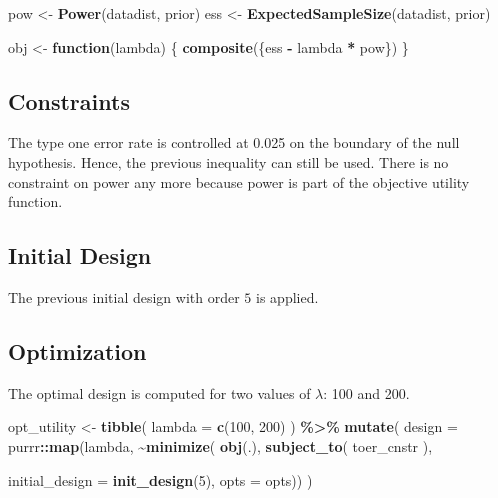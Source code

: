 \documentclass[
]{book}
\newenvironment{Shaded}{\begin{snugshade}}{\end{snugshade}}
\newcommand{\ControlFlowTok}[1]{\textcolor[rgb]{0.13,0.29,0.53}{\textbf{#1}}}
\newcommand{\DataTypeTok}[1]{\textcolor[rgb]{0.13,0.29,0.53}{#1}}
\newcommand{\DecValTok}[1]{\textcolor[rgb]{0.00,0.00,0.81}{#1}}
\newcommand{\KeywordTok}[1]{\textcolor[rgb]{0.13,0.29,0.53}{\textbf{#1}}}
\newcommand{\NormalTok}[1]{#1}
\newcommand{\OperatorTok}[1]{\textcolor[rgb]{0.81,0.36,0.00}{\textbf{#1}}}
\newcommand{\StringTok}[1]{\textcolor[rgb]{0.31,0.60,0.02}{#1}}
\begin{document}
\begin{Shaded}
\begin{Highlighting}[]
\NormalTok{pow \textless{}{-}}\StringTok{ }\KeywordTok{Power}\NormalTok{(datadist, prior)}
\NormalTok{ess \textless{}{-}}\StringTok{ }\KeywordTok{ExpectedSampleSize}\NormalTok{(datadist, prior)}

\NormalTok{obj \textless{}{-}}\StringTok{ }\ControlFlowTok{function}\NormalTok{(lambda) \{}
  \KeywordTok{composite}\NormalTok{(\{ess }\OperatorTok{{-}}\StringTok{ }\NormalTok{lambda }\OperatorTok{*}\StringTok{ }\NormalTok{pow\})}
\NormalTok{\}}
\end{Highlighting}
\end{Shaded}

\hypertarget{constraints-11}{%
\subsection{Constraints}\label{constraints-11}}

The type one error rate is controlled at 0.025 on the boundary of the
null hypothesis. Hence, the previous inequality can still be used.
There is no constraint on power any more because power is part of the
objective utility function.

\hypertarget{initial-design-9}{%
\subsection{Initial Design}\label{initial-design-9}}

The previous initial design with order \(5\) is applied.

\hypertarget{optimization-10}{%
\subsection{Optimization}\label{optimization-10}}

The optimal design is computed for two values of \(\lambda\): 100 and 200.

\begin{Shaded}
\begin{Highlighting}[]
\NormalTok{opt\_utility \textless{}{-}}\StringTok{ }\KeywordTok{tibble}\NormalTok{(}
  \DataTypeTok{lambda =} \KeywordTok{c}\NormalTok{(}\DecValTok{100}\NormalTok{, }\DecValTok{200}\NormalTok{)}
\NormalTok{) }\OperatorTok{\%\textgreater{}\%}
\StringTok{  }\KeywordTok{mutate}\NormalTok{(}
    \DataTypeTok{design =}\NormalTok{ purrr}\OperatorTok{::}\KeywordTok{map}\NormalTok{(lambda, }\OperatorTok{\textasciitilde{}}\KeywordTok{minimize}\NormalTok{(}
          \KeywordTok{obj}\NormalTok{(.),}
          \KeywordTok{subject\_to}\NormalTok{(}
\NormalTok{              toer\_cnstr}
\NormalTok{          ),}
          
          \DataTypeTok{initial\_design =} \KeywordTok{init\_design}\NormalTok{(}\DecValTok{5}\NormalTok{), }
          \DataTypeTok{opts           =}\NormalTok{ opts)) }
\NormalTok{)}
\end{Highlighting}
\end{Shaded}
\end{document}
